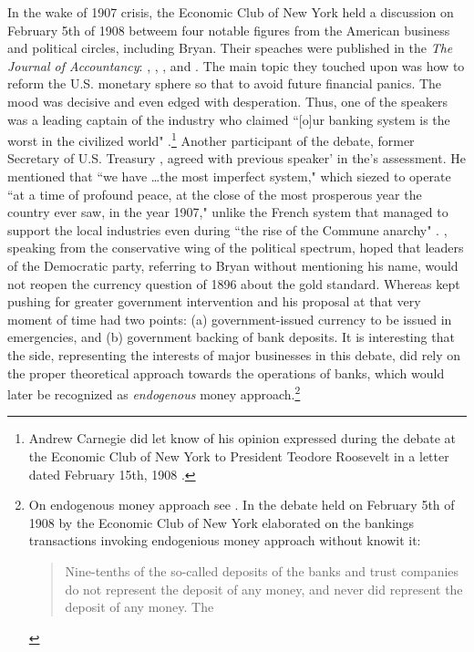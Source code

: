 In the wake of 1907 crisis, the Economic Club of New York held a discussion on February 5th of 1908 betweem four notable figures from the American business and political circles, including Bryan. Their speaches were published in the \textit{The Journal of Accountancy}: \cite{morawetz1908}, \cite{carnegie1908}, \cite{gage1908}, and \cite{bryan1908}. The main topic they touched upon was how to reform the U.S. monetary sphere so that to avoid future financial panics. The mood was decisive and even edged with desperation. Thus, one of the speakers was a leading captain of the industry \citeauthor{carnegie1908} who claimed ``[o]ur banking system is the worst in the civilized world" \cite[p.~357]{carnegie1908}.\footnote{Andrew Carnegie did let know of his opinion expressed during the debate at the Economic Club of New York to President Teodore Roosevelt in a letter dated February 15th, 1908 \citep{carnegie1908_}.} Another participant of the debate, former Secretary of U.S. Treasury \citeauthor{gage1908}, agreed with previous speaker' in the's assessment. He mentioned that ``we have \dots the most imperfect system," which siezed to operate ``at a time of profound peace, at the close of the most prosperous year the country ever saw, in the year 1907," unlike the French system that managed to support the local industries even during ``the rise of the Commune anarchy" \cite[p.~362-363]{gage1908}. \cite{morawetz1909}, speaking from the conservative wing of the political spectrum, hoped that leaders of the Democratic party, referring to Bryan without mentioning his name, would not reopen the currency question of 1896 about the gold standard. Whereas \cite{bryan1908} kept pushing for greater government intervention and his proposal at that very moment of time had two points: (a) government-issued currency to be issued in emergencies, and (b) government backing of bank deposits. It is interesting that the side, representing the interests of major businesses in this debate, did rely on the proper theoretical approach towards the operations of banks, which would later be recognized as \textit{endogenous} money approach.\footnote{On endogenous money approach see \cite{wray1990}. In the debate held on February 5th of 1908 by the Economic Club of New York \citeauthor{morawetz1908} elaborated on the bankings transactions invoking endogenious money approach without knowit it: \begin{quote}Nine-tenths of the so-called deposits of the banks and trust companies do not represent the deposit of any
money, and never did represent the deposit of any money. The

\end{quote}}
